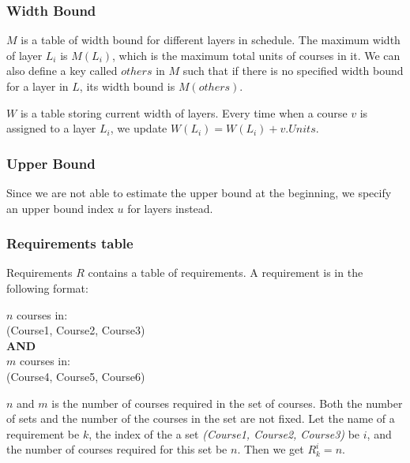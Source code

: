 \documentclass[letterpaper,12pt]{article}
\theoremstyle{definition}
\begin{document}
\subsubsection{Width Bound}
$M$ is a table of width bound for different layers in schedule. The maximum width of layer $L_i$ is $M(L_i)$, which is the maximum total units of courses in it. We can also define a key called $others$ in $M$ such that if there is no specified width bound for a layer in $L$, its width bound is $M(others)$.

$W$ is a table storing current width of layers. Every time when a course $v$ is assigned to a layer $L_i$, we update $W(L_i)=W(L_i)+v.Units$.
\subsubsection{Upper Bound}
Since we are not able to estimate the upper bound at the beginning, we specify an upper bound index $u$ for layers instead. 
\subsubsection{Requirements table}
Requirements $R$ contains a table of requirements. A requirement is in the following format:
    \begin{displayquote}
    $n$ courses in:\\
    (Course1, Course2, Course3)\\
    \textbf{AND}\\
    $m$ courses in:\\
    (Course4, Course5, Course6)
    \end{displayquote}
$n$ and $m$ is the number of courses required in the set of courses. Both the number of sets and the number of the courses in the set are not fixed.
Let the name of a requirement be $k$, the index of the a set \textit{(Course1, Course2, Course3)} be $i$, and the number of courses required for this set be $n$. Then we get $R_k^i=n$. 
\end{document}
